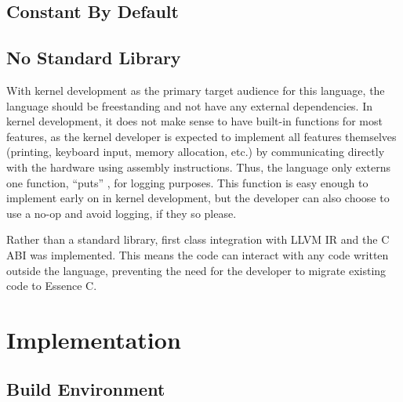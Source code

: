 \documentclass[12pt,a4paper,twoside]{report}
\begin{document}
\subsection{Constant By Default}

\subsection{No Standard Library}

With kernel development as the primary target audience for this language, the language should be freestanding and not have any external dependencies. In kernel development, it does not make sense to have built-in functions for most features, as the kernel developer is expected to implement all features themselves (printing, keyboard input, memory allocation, etc.) by communicating directly with the hardware using assembly instructions. Thus, the language only externs one function, ``puts'' , for logging purposes. This function is easy enough to implement early on in kernel development, but the developer can also choose to use a no-op and avoid logging, if they so please.

Rather than a standard library, first class integration with LLVM IR and the C ABI was implemented. This means the code can interact with any code written outside the language, preventing the need for the developer to migrate existing code to Essence C.

\section{Implementation}

\subsection{Build Environment}
\end{document}
